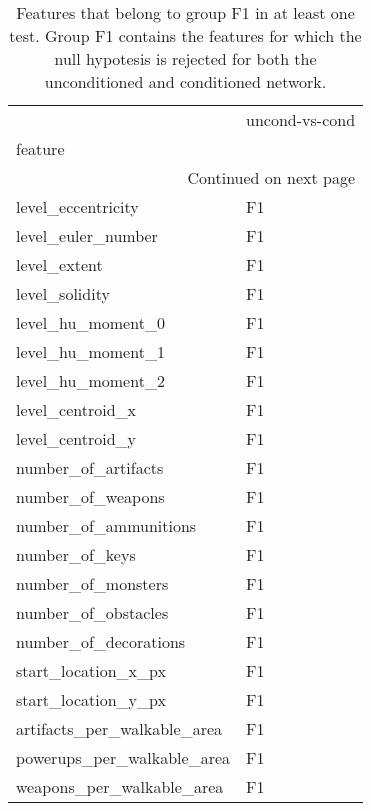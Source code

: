 \documentclass{report}
\begin{document}
\begin{longtable}{ll}
	\caption[Features belonging to the F1 group]{ \small Features that belong to group F1 in at least one test. Group F1 contains the features for which the null hypotesis is rejected for both the unconditioned and conditioned network.}\\
	\toprule
	{} & uncond-vs-cond \\
	feature                       &                \\
	\midrule
	\endhead
	\midrule
	\multicolumn{2}{r}{{Continued on next page}} \\
	\midrule
	\endfoot
	
	\bottomrule
	\endlastfoot
	level\_eccentricity            &             F1 \\
	level\_euler\_number            &             F1 \\
	level\_extent                  &             F1 \\
	level\_solidity                &             F1 \\
	level\_hu\_moment\_0             &             F1 \\
	level\_hu\_moment\_1             &             F1 \\
	level\_hu\_moment\_2             &             F1 \\
	level\_centroid\_x              &             F1 \\
	level\_centroid\_y              &             F1 \\
	number\_of\_artifacts           &             F1 \\
	number\_of\_weapons             &             F1 \\
	number\_of\_ammunitions         &             F1 \\
	number\_of\_keys                &             F1 \\
	number\_of\_monsters            &             F1 \\
	number\_of\_obstacles           &             F1 \\
	number\_of\_decorations         &             F1 \\
	start\_location\_x\_px           &             F1 \\
	start\_location\_y\_px           &             F1 \\
	artifacts\_per\_walkable\_area   &             F1 \\
	powerups\_per\_walkable\_area    &             F1 \\
	weapons\_per\_walkable\_area     &             F1 \\

\end{longtable}
\end{document}

